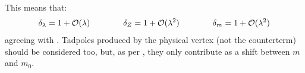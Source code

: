 This means that:
\begin{equation}
  \delta_\lambda = 1 + \mathcal{O}(\lambda)
  \qquad \qquad
  \delta_Z = 1 + \mathcal{O}(\lambda^2)
  \qquad \qquad
  \delta_m = 1 + \mathcal{O}(\lambda^2)
\end{equation}
agreeing with . Tadpoles produced by the physical vertex (not the counterterm) should be considered too, but, as per , they only contribute as a shift between $ m $ and $ m_0 $.










